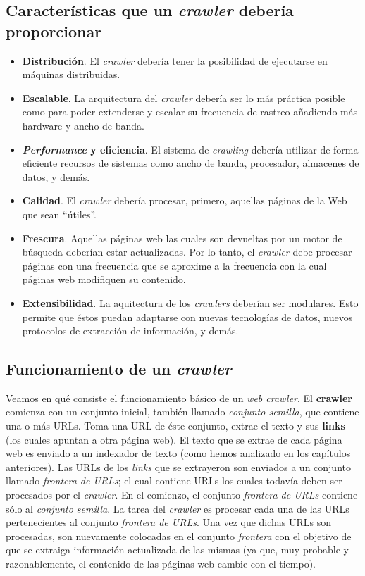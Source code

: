 	\subsection{Características que un \textit{crawler} debería proporcionar}
		\begin{itemize}
			\item \textbf{Distribución}. El \textit{crawler} debería tener la posibilidad de ejecutarse en máquinas distribuidas.
			\item \textbf{Escalable}. La arquitectura del \textit{crawler} debería ser lo más práctica posible como para poder extenderse y escalar su frecuencia de rastreo añadiendo más hardware y ancho de banda.
			\item \textbf{\textit{Performance} y eficiencia}. El sistema de \textit{crawling} debería utilizar de forma eficiente recursos de sistemas como ancho de banda, procesador, almacenes de datos, y demás.
			\item \textbf{Calidad}. El \textit{crawler} debería procesar, primero, aquellas páginas de la Web que sean \enquote{útiles}.
			\item \textbf{Frescura}. Aquellas páginas web las cuales son devueltas por un motor de búsqueda deberían estar actualizadas. Por lo tanto, el \textit{crawler} debe procesar páginas con una frecuencia que se aproxime a la frecuencia con la cual páginas web modifiquen su contenido.
			\item \textbf{Extensibilidad}. La aquitectura de los \textit{crawlers} deberían ser modulares. Esto permite que éstos puedan adaptarse con nuevas tecnologías de datos, nuevos protocolos de extracción de información, y demás.
		\end{itemize}
		
	\subsection{Funcionamiento de un \textit{crawler}}
		Veamos en qué consiste el funcionamiento básico de un \textit{web crawler}. El \textbf{crawler} comienza con un conjunto inicial, también llamado \textit{conjunto semilla}, que contiene una o más URLs. Toma una URL de éste conjunto, extrae el texto y sus \textbf{links} (los cuales apuntan a otra página web). El texto que se extrae de cada página web es enviado a un indexador de texto (como hemos analizado en los capítulos anteriores). Las URLs de los \textit{links} que se extrayeron son enviados a un conjunto llamado \textit{frontera de URLs}; el cual contiene URLs los cuales todavía deben ser procesados por el \textit{crawler}. En el comienzo, el conjunto \textit{frontera de URLs} contiene sólo al \textit{conjunto semilla}. La tarea del \textit{crawler} es procesar cada una de las URLs pertenecientes al conjunto \textit{frontera de URLs}. Una vez que dichas URLs son procesadas, son nuevamente colocadas en el conjunto \textit{frontera} con el objetivo de que se extraiga información actualizada de las mismas (ya que, muy probable y razonablemente, el contenido de las páginas web cambie con el tiempo).
